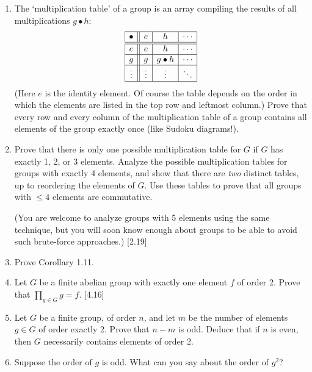\begin{enumerate}
    \item The `multiplication table' of a group is an array compiling the results of all multiplications $g \bullet h$:
          \[
              \begin{array}{|c||c|c|c|}
                  \hline
                  \bullet & e      & h           & \cdots \\
                  \hline\hline
                  e       & e      & h           & \cdots \\
                  \hline
                  g       & g      & g \bullet h & \cdots \\
                  \hline
                  \vdots  & \vdots & \vdots      & \ddots \\
                  \hline
              \end{array}
          \]
          (Here $e$ is the identity element. Of course the table depends on the order in which the elements are listed in the top row and leftmost column.) Prove that every row and every column of the multiplication table of a group contains all elements of the group exactly once (like Sudoku diagrams!).

    \item Prove that there is only one possible multiplication table for $G$ if $G$ has exactly 1, 2, or 3 elements. Analyze the possible multiplication tables for groups with exactly 4 elements, and show that there are \textit{two} distinct tables, up to reordering the elements of $G$. Use these tables to prove that all groups with $\le 4$ elements are commutative.

          (You are welcome to analyze groups with 5 elements using the same technique, but you will soon know enough about groups to be able to avoid such brute-force approaches.) [2.19]

    \item Prove Corollary 1.11.

    \item Let $G$ be a finite abelian group with exactly one element $f$ of order 2. Prove that $\prod_{g \in G} g = f$. [4.16]

    \item Let $G$ be a finite group, of order $n$, and let $m$ be the number of elements $g \in G$ of order exactly 2. Prove that $n-m$ is odd. Deduce that if $n$ is even, then $G$ necessarily contains elements of order 2.

    \item Suppose the order of $g$ is odd. What can you say about the order of $g^2$?


\end{enumerate}
